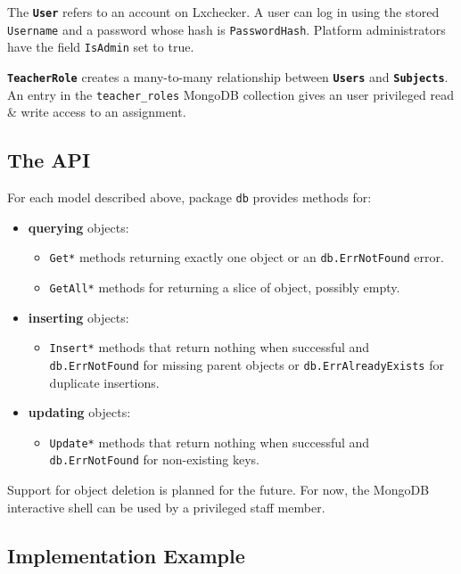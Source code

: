 The \textbf{\texttt{User}} refers to an account on Lxchecker. A user can log in using the stored \texttt{Username} and a password whose hash is \texttt{PasswordHash}. Platform administrators have the field \texttt{IsAdmin} set to true.

\textbf{\texttt{TeacherRole}} creates a many-to-many relationship between \textbf{\texttt{Users}} and \textbf{\texttt{Subjects}}. An entry in the \texttt{teacher_roles} MongoDB collection gives an user privileged read \& write access to an assignment.

\subsection{The API}
\label{sub-sec:storage-api}

For each model described above, package \texttt{db} provides methods for:
\begin{itemize}
	\item \textbf{querying} objects:
		\begin{itemize}
			\item \texttt{Get*} methods returning exactly one object or an \texttt{db.ErrNotFound} error.
			\item \texttt{GetAll*} methods for returning a slice of object, possibly empty.
		\end{itemize}
	\item \textbf{inserting} objects:
		\begin{itemize}
			\item \texttt{Insert*} methods that return nothing when successful and \texttt{db.ErrNotFound} for missing parent objects or \texttt{db.ErrAlreadyExists} for duplicate insertions.
		\end{itemize}
	\item \textbf{updating} objects:
		\begin{itemize}
			\item \texttt{Update*} methods that return nothing when successful and \texttt{db.ErrNotFound} for non-existing keys.
		\end{itemize}
\end{itemize}

Support for object deletion is planned for the future. For now, the MongoDB interactive shell can be used by a privileged staff member.

\subsection{Implementation Example}
\label{sub-sec:db-implementation}

